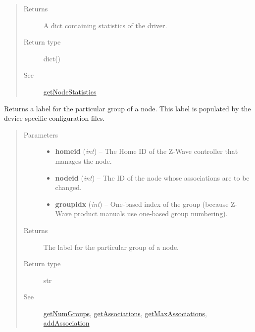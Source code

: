 \documentclass[letterpaper,10pt,english]{sphinxmanual}
\begin{document}
\begin{fulllineitems}
\begin{fulllineitems}
\begin{quote}
\begin{description}
\begin{itemize}
\end{itemize}

\item[{Returns}] \leavevmode
A dict containing statistics of the driver.

\item[{Return type}] \leavevmode
dict()

\item[{See}] \leavevmode
{\hyperref[libopenzwave:getnodestatistics]{getNodeStatistics}}

\end{description}\end{quote}

\end{fulllineitems}


\begin{fulllineitems}
\label{libopenzwave:libopenzwave.PyManager.getGroupLabel}
Returns a label for the particular group of a node.
\label{libopenzwave:getgrouplabel}
This label is populated by the device specific configuration files.
\begin{quote}\begin{description}
\item[{Parameters}] \leavevmode\begin{itemize}
\item {} 
\textbf{homeid} (\emph{int}) -- The Home ID of the Z-Wave controller that manages the node.

\item {} 
\textbf{nodeid} (\emph{int}) -- The ID of the node whose associations are to be changed.

\item {} 
\textbf{groupidx} (\emph{int}) -- One-based index of the group (because Z-Wave product manuals use one-based group numbering).

\end{itemize}

\item[{Returns}] \leavevmode
The label for the particular group of a node.

\item[{Return type}] \leavevmode
str

\item[{See}] \leavevmode
{\hyperref[libopenzwave:getnumgroups]{getNumGroups}}, {\hyperref[libopenzwave:getassociations]{getAssociations}}, {\hyperref[libopenzwave:getmaxassociations]{getMaxAssociations}}, {\hyperref[libopenzwave:addassociation]{addAssociation}}


\end{description}
\end{quote}
\end{fulllineitems}
\end{fulllineitems}
\end{document}
